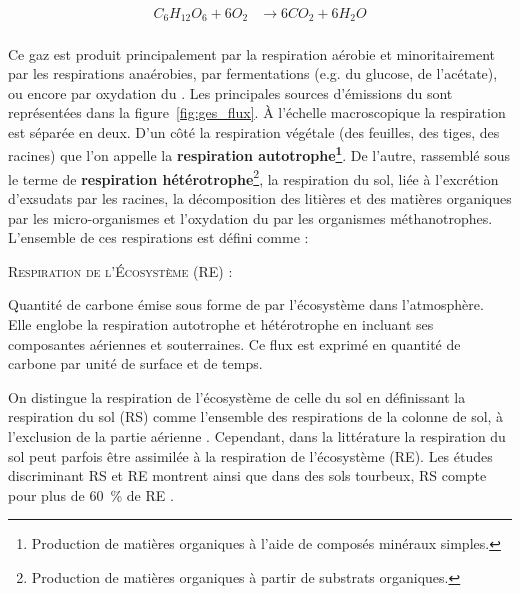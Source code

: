 $$\begin{aligned}\label{eq:respi}
C_{6}H_{12}O_{6} + 6O_{2} &\rightarrow 6CO_{2} + 6H_{2}O \\
\end{aligned} $$

Ce gaz est produit principalement par la respiration aérobie et minoritairement par les respirations anaérobies, par fermentations (e.g. du glucose, de l'acétate), ou encore par oxydation du \chh \citep{lai2009}.
Les principales sources d'émissions du \coo sont représentées dans la figure~\ref{fig:ges_flux}.
À l'échelle macroscopique la respiration est séparée en deux.
D'un côté la respiration végétale (des feuilles, des tiges, des racines) que l'on appelle la \textbf{respiration autotrophe\footnote{Production de matières organiques à l'aide de composés minéraux simples.}}.
De l'autre, rassemblé sous le terme de \textbf{respiration hétérotrophe}\footnote{Production de matières organiques à partir de substrats organiques.}, la respiration du sol, liée à l'excrétion d'exsudats par les racines, la décomposition des litières et des matières organiques par les micro-organismes et l'oxydation du \chh par les organismes méthanotrophes.
L'ensemble de ces respirations est défini comme : 
\begin{pdef}
\textsc{Respiration de l'Écosystème (RE)} :

Quantité de carbone émise sous forme de \coo par l'écosystème dans l'atmosphère. 
Elle englobe la respiration autotrophe et hétérotrophe en incluant ses composantes aériennes et souterraines.
Ce flux est exprimé en quantité de carbone par unité de surface et de temps.
\end{pdef}
On distingue la respiration de l'écosystème de celle du sol en définissant la respiration du sol (RS) comme l'ensemble des respirations de la colonne de sol, à l'exclusion de la partie aérienne \citep{luo20063}.
Cependant, dans la littérature la respiration du sol peut parfois être assimilée à la respiration de l'écosystème (RE)\citep{raich1992}.
Les études discriminant RS et RE montrent ainsi que dans des sols tourbeux, RS compte pour plus de \SI{60}{\percent} de RE \cite{lohila2003}.
%
